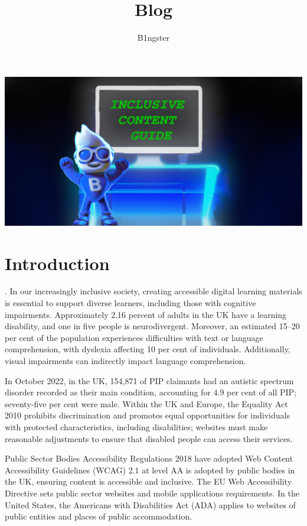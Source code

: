 \documentclass{article}
\title{Blog}
\author{B1ngster}
\date{}
\begin{document}
\begin{titlepage}

        \vskip2cm
        
    \includegraphics[width=14cm]{images/Bingster_inclusive_img.png} %
    \vfill
    \vfill
\end{titlepage}


\newpage
\tableofcontents
\newpage


\section{Introduction}
. 
In our increasingly inclusive society, creating accessible digital learning materials is essential to support diverse learners, including those with cognitive impairments. Approximately 2.16 percent of adults in the UK have a learning disability, and one in five people is neurodivergent. Moreover, an estimated 15–20 per cent of the population experiences difficulties with text or language comprehension, with dyslexia affecting 10 per cent of individuals. Additionally, visual impairments can indirectly impact language comprehension.

In October 2022, in the UK,  154,871 of PIP claimants had an autistic spectrum disorder recorded as their main condition, accounting for 4.9 per cent of all PIP; seventy-five per cent were male. Within the UK and Europe, the Equality Act 2010 prohibits discrimination and promotes equal opportunities for individuals with protected characteristics, including disabilities; websites must make reasonable adjustments to ensure that disabled people can access their services. 

Public Sector Bodies Accessibility Regulations 2018 have adopted Web Content Accessibility Guidelines (WCAG) 2.1 at level AA is adopted by public bodies in the UK, ensuring content is accessible and inclusive. The EU Web Accessibility Directive sets public sector websites and mobile applications requirements. In the United States, the Americans with Disabilities Act (ADA) applies to websites of public entities and places of public accommodation. 
\end{document}

